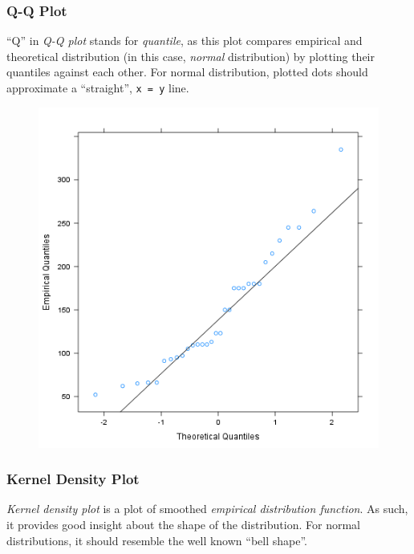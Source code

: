 \documentclass{article}
\makeatletter
\def\maxwidth{\ifdim\Gin@nat@width>\linewidth\linewidth
\else\Gin@nat@width\fi}
\let\Oldincludegraphics\includegraphics
\renewcommand{\includegraphics}[1]{\Oldincludegraphics[width=\maxwidth]{#1}}
\makeatother
\begin{document}
\subsubsection{Q-Q Plot}

``Q'' in \emph{Q-Q plot} stands for \emph{quantile}, as this plot
compares empirical and theoretical distribution (in this case,
\emph{normal} distribution) by plotting their quantiles against each
other. For normal distribution, plotted dots should approximate a
``straight'', \texttt{x = y} line.

\begin{figure}[htbp]
\centering
\includegraphics{17e5c77b83c6e3e636487406decc14c7.png}
\caption{}
\end{figure}

\subsubsection{Kernel Density Plot}

\emph{Kernel density plot} is a plot of smoothed \emph{empirical
distribution function}. As such, it provides good insight about the
shape of the distribution. For normal distributions, it should resemble
the well known ``bell shape''.
\end{document}
